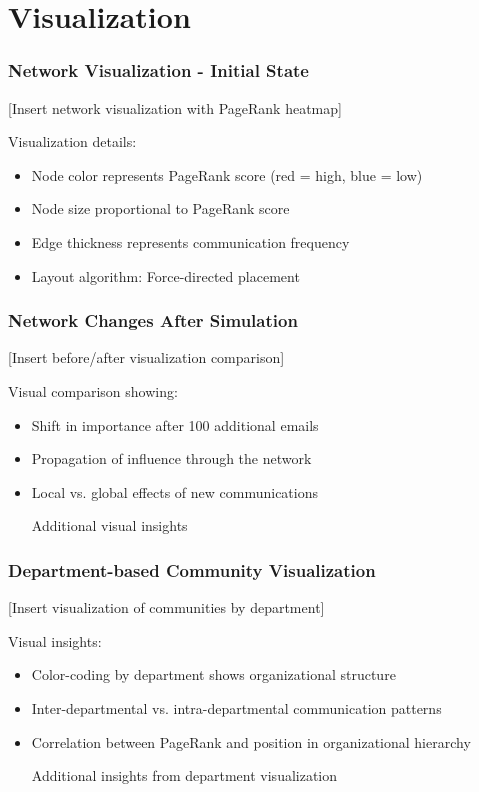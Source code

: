 \documentclass{beamer}
\begin{document}
\section{Visualization}

\begin{frame}
    \frametitle{Network Visualization - Initial State}
    [Insert network visualization with PageRank heatmap]
    
    Visualization details:
    \begin{itemize}
        \item Node color represents PageRank score (red = high, blue = low)
        \item Node size proportional to PageRank score
        \item Edge thickness represents communication frequency
        \item Layout algorithm: Force-directed placement
    \end{itemize}
\end{frame}

\begin{frame}
    \frametitle{Network Changes After Simulation}
    [Insert before/after visualization comparison]
    
    Visual comparison showing:
    \begin{itemize}
        \item Shift in importance after 100 additional emails
        \item Propagation of influence through the network
        \item Local vs. global effects of new communications
        \item [Additional visual insights]
    \end{itemize}
\end{frame}

\begin{frame}
    \frametitle{Department-based Community Visualization}
    [Insert visualization of communities by department]
    
    Visual insights:
    \begin{itemize}
        \item Color-coding by department shows organizational structure
        \item Inter-departmental vs. intra-departmental communication patterns
        \item Correlation between PageRank and position in organizational hierarchy
        \item [Additional insights from department visualization]
    \end{itemize}
\end{frame}
\end{document}
